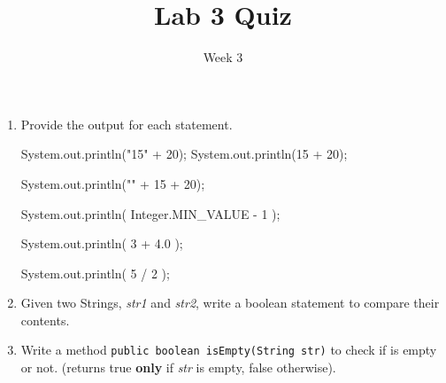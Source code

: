 \documentclass[addpoints]{exam}
\title{Lab 3 Quiz}
\date{Week 3}
\begin{document}
 

\Instructions
\begin{enumerate}
\newline
\item {}
Provide the output for each statement.

\begin{oneparchoices} 
\hspace{0.2cm}
\vspace{2em}

 \choice System.out.println("15" + 20);   
 \newline
 \choice System.out.println(15 + 20);   \vspace{1em}
 \newline \newline

 \choice System.out.println("" + 15 + 20);   \vspace{1em}
 \newline \newline

 \choice System.out.println( Integer.MIN_VALUE - 1 );   \vspace{1em}
 \newline \newline

 \choice System.out.println( 3 + 4.0 );   \vspace{1em}
 \newline \newline

 \choice System.out.println( 5 / 2 ); 
    \newline \newline

 \end{oneparchoices}
 

 
 
 \item {}
Given two Strings, \textit{str1} and \textit{str2}, write a boolean statement to compare their contents.

 \vspace{2em}

 \vspace{2em}

 \item {}
Write a method \texttt{public boolean isEmpty(String str)} to check if  is empty or not. (returns true \textbf{only} if \textit{str} is empty, false otherwise).


\end{enumerate}
\end{document}
